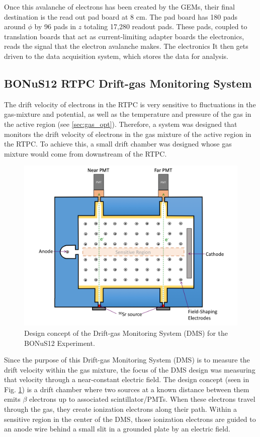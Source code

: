 Once this avalanche of electrons has been created by the GEMs, their final destination is the read out pad board at 8 cm. The pad board has 180 pads around $\phi$ by 96 pads in $z$ totaling 17,280 readout pads. These pads, coupled to translation boards that act as current-limiting adapter boards the electronics, reads the signal that the electron avalanche makes. The electronics It then gets driven to the data acquisition system, which stores the data for analysis.

\subsection{BONuS12 RTPC Drift-gas Monitoring System}
The drift velocity of electrons in the RTPC is very sensitive to fluctuations in the gas-mixture and potential, as well as the temperature and pressure of the gas in the active region (see \ref{sec:gas_opt}). Therefore, a system was designed that monitors the drift velocity of electrons in the gas mixture of the active region in the RTPC. To achieve this, a small drift chamber was designed whose gas mixture would come from downstream of the RTPC.

\begin{figure}[h!]
	\centering
	\includegraphics[width=0.8\linewidth]{figures/dms_concept.png}
	\caption{Design concept of the Drift-gas Monitoring System (DMS) for the BONuS12 Experiment.}
	\label{fig:dms_concept}
\end{figure}

Since the purpose of this Drift-gas Monitoring System (DMS) is to measure the drift velocity within the gas mixture, the focus of the DMS design was measuring that velocity through a near-constant electric field. The design concept (seen in Fig. \ref{fig:dms_concept}) is a drift chamber where two sources at a known distance between them emits $\beta$ electrons up to associated scintillator/PMTs. When these electrons travel through the gas, they create ionization electrons along their path. Within a sensitive region in the center of the DMS, those ionization electrons are guided to an anode wire behind a small slit in a grounded plate by an electric field. 

